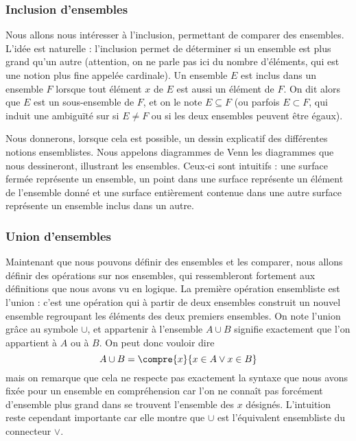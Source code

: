 \subsubsection{Inclusion d'ensembles}

Nous allons nous intéresser à l'inclusion, permettant de comparer des ensembles. L'idée est naturelle : l'inclusion permet de déterminer si un ensemble est plus grand qu'un autre (attention, on ne parle pas ici du nombre d'éléments, qui est une notion plus fine appelée cardinale). Un ensemble $E$ est inclus dans un ensemble $F$ lorsque tout élément $x$ de $E$ est aussi un élément de $F$. On dit alors que $E$ est un sous-ensemble de $F$, et on le note $E\subseteq F$ (ou parfois $E\subset F$, qui induit une ambiguïté sur si $E\neq F$ ou si les deux ensembles peuvent être égaux).

Nous donnerons, lorsque cela est possible, un dessin explicatif des différentes notions ensemblistes. Nous appelons diagrammes de Venn les diagrammes que nous dessineront, illustrant les ensembles. Ceux-ci sont intuitifs : une surface fermée représente un ensemble, un point dans une surface représente un élément de l'ensemble donné et une surface entièrement contenue dans une autre surface représente un ensemble inclus dans un autre.




\subsubsection{Union d'ensembles}

Maintenant que nous pouvons définir des ensembles et les comparer, nous allons définir des opérations sur nos ensembles, qui ressembleront fortement aux définitions que nous avons vu en logique. La première opération ensembliste est l'union : c'est une opération qui à partir de deux ensembles construit un nouvel ensemble regroupant les éléments des deux premiers ensembles. On note l'union grâce au symbole $\cup$, et appartenir à l'ensemble $A\cup B$ signifie exactement que l'on appartient à $A$ ou à $B$. On peut donc vouloir dire $$A\cup B = \compre{x}{x\in A \lor x \in B}$$ mais on remarque que cela ne respecte pas exactement la syntaxe que nous avons fixée pour un ensemble en compréhension car l'on ne connaît pas forcément d'ensemble plus grand dans se trouvent l'ensemble des $x$ désignés. L'intuition reste cependant importante car elle montre que $\cup$ est l'équivalent ensembliste du connecteur $\lor$.

